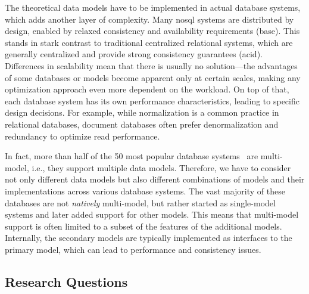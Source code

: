 The theoretical data models have to be implemented in actual database systems, which adds another layer of complexity. Many \acrshort{nosql} systems are distributed by design, enabled by relaxed consistency and availability requirements (\acrshort{base}). This stands in stark contrast to traditional centralized relational systems, which are generally centralized and provide strong consistency guarantees (\acrshort{acid}). Differences in scalability mean that there is usually no  solution---the advantages of some databases or models become apparent only at certain scales, making any optimization approach even more dependent on the workload. On top of that, each database system has its own performance characteristics, leading to specific design decisions. For example, while normalization is a common practice in relational databases, document databases often prefer denormalization and redundancy to optimize read performance.

In fact, more than half of the 50 most popular database systems~\citep{DBEngines2026} are multi-model, i.e., they support multiple data models. Therefore, we have to consider not only different data models but also different combinations of models and their implementations across various database systems. The vast majority of these databases are not \emph{natively} multi-model, but rather started as single-model systems and later added support for other models. This means that multi-model support is often limited to a subset of the features of the additional models. Internally, the secondary models are typically implemented as interfaces to the primary model, which can lead to performance and consistency issues.

\subsection{Research Questions}
\label{sec:research-questions}

